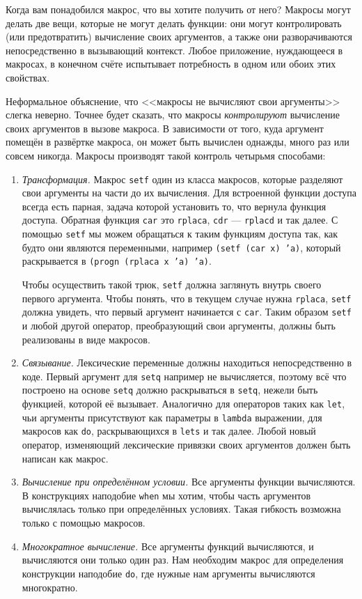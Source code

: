 \documentclass[12pt, a4paper]{article} %
\begin{document}
Когда вам понадобился макрос, что вы хотите получить от него? Макросы могут делать две вещи, которые не могут делать функции: они могут контролировать (или предотвратить) вычисление своих аргументов, а также они разворачиваются непосредственно в вызывающий контекст. Любое приложение, нуждающееся в макросах, в конечном счёте испытывает потребность в одном или обоих этих свойствах.

Неформальное объяснение, что <<макросы не вычисляют свои аргументы>> слегка неверно. Точнее будет сказать, что макросы \textit{контролируют} вычисление своих аргументов в вызове макроса. В зависимости от того, куда аргумент помещён в развёртке макроса, он может быть вычислен однажды, много раз или совсем никогда. Макросы производят такой контроль четырьмя способами:
\begin{enumerate}
    \item \textit{Трансформация.} Макрос \texttt{setf} один из класса макросов, которые разделяют свои аргументы на части до их вычисления. Для встроенной функции доступа всегда есть парная, задача которой  установить то, что вернула функция доступа. Обратная функция \texttt{car} это \texttt{rplaca}, \texttt{cdr} --- \texttt{rplacd} и так далее. С помощью \texttt{setf} мы можем обращаться к таким функциям доступа так, как будто они являются переменными, например \texttt{(setf (car x) 'a)}, который раскрывается в \texttt{(progn (rplaca x 'a) 'a)}.

    Чтобы осуществить такой трюк, \texttt{setf} должна заглянуть внутрь своего первого аргумента. Чтобы понять, что в текущем случае нужна \texttt{rplaca}, \texttt{setf} должна увидеть, что первый аргумент начинается с \texttt{car}. Таким образом \texttt{setf} и любой другой оператор, преобразующий свои аргументы, должны быть реализованы в виде макросов.

    \item \textit{Связывание.} Лексические переменные должны находиться непосредственно в коде. Первый аргумент для \texttt{setq} например не вычисляется, поэтому всё что построено на основе \texttt{setq} должно раскрываться в \texttt{setq}, нежели быть функцией, которой её вызывает. Аналогично для операторов таких как \texttt{let}, чьи аргументы присутствуют как параметры в \texttt{lambda} выражении, для макросов как \texttt{do}, раскрывающихся в \texttt{lets} и так далее. Любой новый оператор, изменяющий лексические привязки своих аргументов должен быть написан как макрос.
    \item \textit{Вычисление при определённом условии.} Все аргументы функции вычисляются. В конструкциях наподобие \texttt{when} мы хотим, чтобы часть аргументов вычислялась только при определённых условиях. Такая гибкость возможна только с помощью макросов.
    \item \textit{Многократное вычисление.} Все аргументы функций вычисляются, и вычисляются они только один раз. Нам необходим макрос для определения конструкции наподобие \texttt{do}, где нужные нам аргументы вычисляются многократно.
\end{enumerate}
\end{document}
